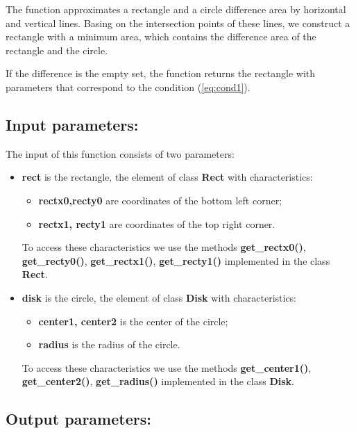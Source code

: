 \documentclass{report}
\begin{document}
The function approximates a rectangle and a circle difference area by horizontal and vertical lines. Basing on the intersection points of these lines, we construct a rectangle with a minimum area, which contains the difference area of the rectangle and the circle.

If the difference is the empty set, the function returns the rectangle with parameters that correspond to the condition (\ref{eq:cond1}).

\subsection*{Input parameters:}

The input of this function consists of two parameters:

\begin{itemize}
	\item {\bfseries	rect} is the rectangle, the element of class {\bfseries Rect} with characteristics:
	\begin{itemize}
		\item {\bfseries rectx0,recty0} are coordinates of the bottom left corner;
		\item {\bfseries rectx1, recty1} are coordinates of the top right corner.
	\end{itemize}
	
	To access these characteristics we use the methods  {\bfseries get\_rectx0()}, {\bfseries get\_recty0()}, {\bfseries get\_rectx1()}, {\bfseries get\_recty1()} implemented in the class {\bfseries Rect}.
	
	\item {\bfseries disk}  is the circle, the element of class {\bfseries Disk} with characteristics:
	\begin{itemize}
		\item {\bfseries center1, center2}  is the center of the circle;
		\item {\bfseries radius}  is  the radius of the circle.
	\end{itemize}
	
	To access these characteristics we use the methods {\bfseries get\_center1()}, {\bfseries get\_center2()}, {\bfseries get\_radius()} implemented in the class {\bfseries Disk}.
\end{itemize}

\subsection*{Output parameters:}
\end{document}
